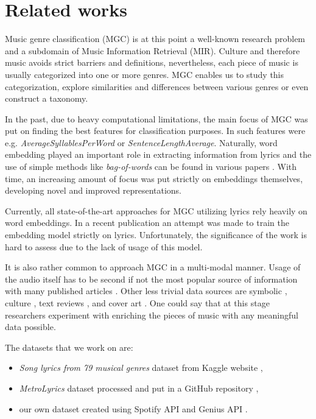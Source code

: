 \section{Related works}\label{related_work}

Music genre classification (MGC) is at this point a well-known research problem and a subdomain of Music Information Retrieval (MIR). Culture and therefore music avoids strict barriers and definitions, nevertheless, each piece of music is usually categorized into one or more genres. MGC enables us to study this categorization, explore similarities and differences between various genres or even construct a taxonomy. 

In the past, due to heavy computational limitations, the main focus of MGC was put on finding the best features for classification purposes. In \cite{oldFeatures} such features were e.g. \textit{AverageSyllablesPerWord} or \textit{SentenceLengthAverage}. Naturally, word embedding played an important role in extracting information from lyrics and the use of simple methods like \textit{bag-of-words} can be found in various papers \cite{mgc_example_1, liang2011music}. With time, an increasing amount of focus was put strictly on embeddings themselves, developing novel and improved representations. 

Currently, all state-of-the-art approaches for MGC utilizing lyrics rely heavily on word embeddings. In a recent publication \cite{musicWordEmbed} an attempt was made to train the embedding model strictly on lyrics. Unfortunately, the significance of the work is hard to assess due to the lack of usage of this model.

It is also rather common to approach MGC in a multi-modal manner. Usage of the audio itself has to be second if not the most popular source of information with many published articles \cite{audio_1dcnn, audio_attention, audio_reviews_cover, oldFeatures, oldAudio}. Other less trivial data sources are symbolic \cite{symbolic}, culture \cite{oldFeatures}, text reviews \cite{audio_reviews_cover}, and cover art \cite{audio_reviews_cover}. One could say that at this stage researchers experiment with enriching the pieces of music with any meaningful data possible.

The datasets that we work on are:
\begin{itemize}
    \item \textit{Song lyrics from 79 musical genres} dataset from Kaggle website \cite{KaggleDataset},
    \item \textit{MetroLyrics} dataset processed and put in a GitHub repository \cite{GithubDataset},
    \item our own dataset created using Spotify API \cite{Spotify} and Genius API \cite{Genius}.
\end{itemize}

